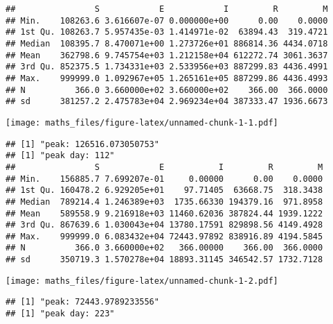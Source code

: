 \documentclass[
]{article}
\newenvironment{Shaded}{\begin{snugshade}}{\end{snugshade}}
\newcommand{\AttributeTok}[1]{\textcolor[rgb]{0.13,0.29,0.53}{#1}}
\newcommand{\DecValTok}[1]{\textcolor[rgb]{0.00,0.00,0.81}{#1}}
\newcommand{\FunctionTok}[1]{\textcolor[rgb]{0.13,0.29,0.53}{\textbf{#1}}}
\newcommand{\NormalTok}[1]{#1}
\newcommand{\OtherTok}[1]{\textcolor[rgb]{0.56,0.35,0.01}{#1}}
\newcommand{\SpecialCharTok}[1]{\textcolor[rgb]{0.81,0.36,0.00}{\textbf{#1}}}
\newcommand{\StringTok}[1]{\textcolor[rgb]{0.31,0.60,0.02}{#1}}
\begin{document}
\begin{Shaded}
\end{Shaded}

\begin{verbatim}
##                S            E            I         R         M
## Min.    108263.6 3.616607e-07 0.000000e+00      0.00    0.0000
## 1st Qu. 108263.7 5.957435e-03 1.414971e-02  63894.43  319.4721
## Median  108395.7 8.470071e+00 1.273726e+01 886814.36 4434.0718
## Mean    362798.6 9.745754e+03 1.212158e+04 612272.74 3061.3637
## 3rd Qu. 852375.5 1.734331e+03 2.533956e+03 887299.83 4436.4991
## Max.    999999.0 1.092967e+05 1.265161e+05 887299.86 4436.4993
## N          366.0 3.660000e+02 3.660000e+02    366.00  366.0000
## sd      381257.2 2.475783e+04 2.969234e+04 387333.47 1936.6673
\end{verbatim}

\texttt{[image: maths\_files/figure-latex/unnamed-chunk-1-1.pdf]}

\begin{verbatim}
## [1] "peak: 126516.073050753"
## [1] "peak day: 112"
##                S            E           I         R         M
## Min.    156885.7 7.699207e-01     0.00000      0.00    0.0000
## 1st Qu. 160478.2 6.929205e+01    97.71405  63668.75  318.3438
## Median  789214.4 1.246389e+03  1735.66330 194379.16  971.8958
## Mean    589558.9 9.216918e+03 11460.62036 387824.44 1939.1222
## 3rd Qu. 867639.6 1.030043e+04 13780.17591 829898.56 4149.4928
## Max.    999999.0 6.083432e+04 72443.97892 838916.89 4194.5845
## N          366.0 3.660000e+02   366.00000    366.00  366.0000
## sd      350719.3 1.570278e+04 18893.31145 346542.57 1732.7128
\end{verbatim}

\texttt{[image: maths\_files/figure-latex/unnamed-chunk-1-2.pdf]}

\begin{verbatim}
## [1] "peak: 72443.9789233556"
## [1] "peak day: 223"
\end{verbatim}
\end{document}
